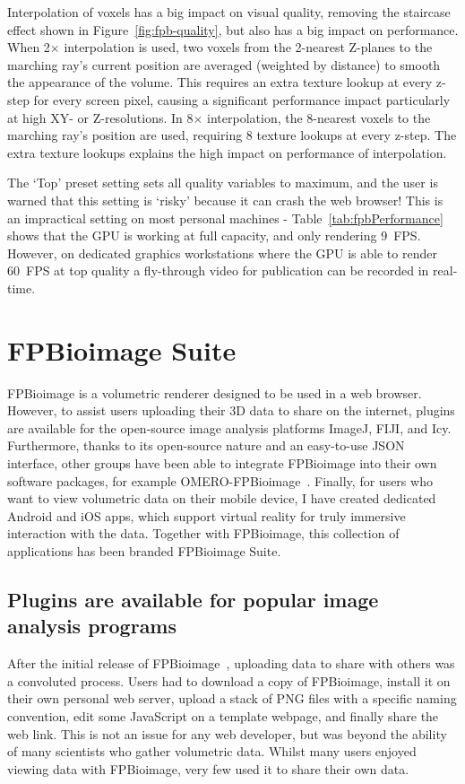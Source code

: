 Interpolation of voxels has a big impact on visual quality, removing the staircase effect shown in Figure~\ref{fig:fpb-quality}, but also has a big impact on performance.
When 2$\times$ interpolation is used, two voxels from the 2-nearest Z-planes to the marching ray's current position are averaged (weighted by distance) to smooth the appearance of the volume.
This requires an extra texture lookup at every z-step for every screen pixel, causing a significant performance impact particularly at high XY- or Z-resolutions.
In 8$\times$ interpolation, the 8-nearest voxels to the marching ray's position are used, requiring 8 texture lookups at every z-step.
The extra texture lookups explains the high impact on performance of interpolation.

The `Top' preset setting sets all quality variables to maximum, and the user is warned that this setting is `risky' because it can crash the web browser!
This is an impractical setting on most personal machines - Table~\ref{tab:fpbPerformance} shows that the GPU is working at full capacity, and only rendering \SI{9}{FPS}.
However, on dedicated graphics workstations where the GPU is able to render \SI{60}{FPS} at top quality a fly-through video for publication can be recorded in real-time.

\section{FPBioimage Suite}
FPBioimage is a volumetric renderer designed to be used in a web browser.
However, to assist users uploading their 3D data to share on the internet, plugins are available for the open-source image analysis platforms ImageJ, FIJI, and Icy.
Furthermore, thanks to its open-source nature and an easy-to-use JSON interface, other groups have been able to integrate FPBioimage into their own software packages, for example OMERO-FPBioimage~\cite{omero2018website}.
Finally, for users who want to view volumetric data on their mobile device, I have created dedicated Android and iOS apps, which support virtual reality for truly immersive interaction with the data. 
Together with FPBioimage, this collection of applications has been branded FPBioimage Suite.

\subsection{Plugins are available for popular image analysis programs}
After the initial release of FPBioimage~\cite{fantham2017new}, uploading data to share with others was a convoluted process.
Users had to download a copy of FPBioimage, install it on their own personal web server, upload a stack of PNG files with a specific naming convention, edit some JavaScript on a template webpage, and finally share the web link.
This is not an issue for any web developer, but was beyond the ability of many scientists who gather volumetric data.
Whilst many users enjoyed viewing data with FPBioimage, very few used it to share their own data.

